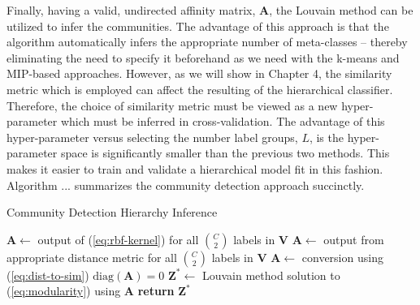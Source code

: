 \documentclass[../thesis.tex]{subfiles}
\begin{document}
Finally, having a valid, undirected affinity matrix, $\mathbf{A}$, the Louvain method can be utilized to infer the communities. The advantage of this approach is that the algorithm automatically infers the appropriate number of meta-classes -- thereby eliminating the need to specify it beforehand as we need with the k-means and MIP-based approaches. However, as we will show in Chapter 4, the similarity metric which is employed can affect the resulting of the hierarchical classifier. Therefore, the choice of similarity metric must be viewed as a new hyper-parameter which must be inferred in cross-validation. The advantage of this hyper-parameter versus selecting the number label groups, $L$, is the hyper-parameter space is significantly smaller than the previous two methods. This makes it easier to train and validate a hierarchical model fit in this fashion. Algorithm ... summarizes the community detection approach succinctly.

\begin{algorithm}
    \caption{Community Detection Hierarchy Inference}
    \label{alg:comm-detect}
    \begin{algorithmic}[1]
                \State $\mathbf{A} \gets $ output of (\ref{eq:rbf-kernel}) for all $\binom{C}{2}$ labels in $\mathbf{V}$
            \Else{}
                \State $\mathbf{A} \gets$ output from appropriate distance metric for all $\binom{C}{2}$ labels in $\mathbf{V}$
                \State $\mathbf{A} \gets$ conversion using (\ref{eq:dist-to-sim})
            \EndIf
            \State $\text{diag}(\mathbf{A}) = 0$ 
            \State $\mathbf{Z}^* \gets$ Louvain method solution to (\ref{eq:modularity}) using $\mathbf{A}$
            \State \textbf{return} $\mathbf{Z}^*$
        \EndProcedure
    \end{algorithmic}
\end{algorithm}
\end{document}
